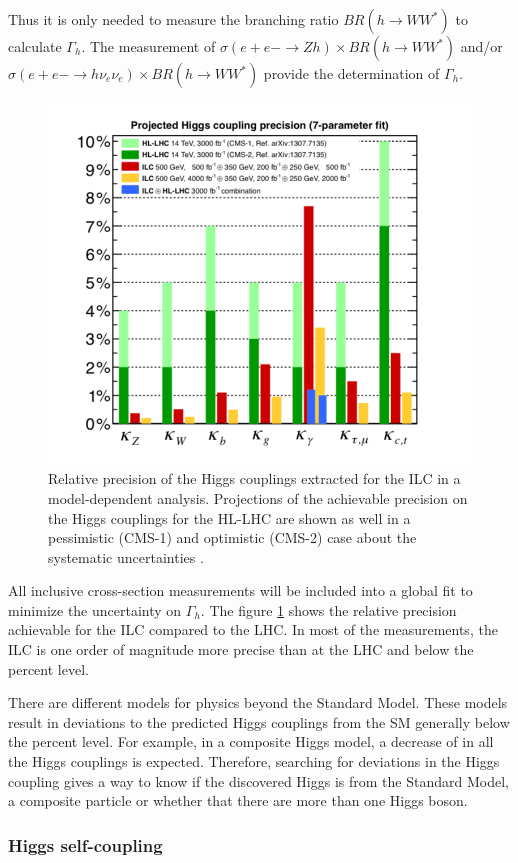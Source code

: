 Thus it is only needed to measure the branching ratio $BR(h \rightarrow WW^*)$ to calculate $\Gamma_{h}$. The measurement of $\sigma(e+e- \rightarrow Zh) \times BR(h \rightarrow WW^*)$ and/or $\sigma(e+e- \rightarrow h\nu_e\nu_e) \times BR(h \rightarrow WW^*)$ provide the determination of $\Gamma_{h}$.
\begin{figure}[htbp!]
  \centering
  \includegraphics[width=0.7\linewidth]{chap2/fig/HiggsCouplings_LHCComp.png}
  \caption{Relative precision of the Higgs couplings extracted for the ILC in a model-dependent analysis. Projections of the achievable precision on the Higgs couplings for the HL-LHC are shown as well in a pessimistic (CMS-1) and optimistic (CMS-2) case about the systematic uncertainties \cite{Fujii:2015jha}.}  \label{fig:HiggsCouplings}
\end{figure}

All inclusive cross-section measurements will be included into a global fit to minimize the uncertainty on $\Gamma_{h}$. The figure \ref{fig:HiggsCouplings} shows the relative precision achievable for the ILC compared to the LHC. In most of the measurements, the ILC is one order of magnitude more precise than at the LHC and below the percent level.

There are different models for physics beyond the Standard Model. These models result in deviations to the predicted Higgs couplings from the SM generally below the percent level. For example, in a composite Higgs model, a decrease of in all the Higgs couplings is expected. Therefore, searching for deviations in the Higgs coupling gives a way to know if the discovered Higgs is from the Standard Model, a composite particle or whether that there are more than one Higgs boson.

\subsubsection{Higgs self-coupling}

